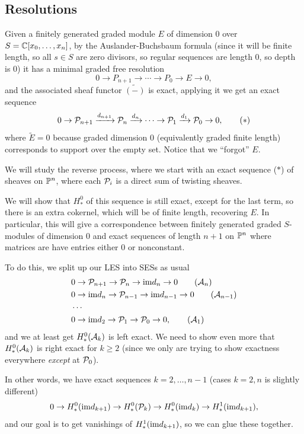 \documentclass[12pt]{article}
\begin{document}
\subsection{Resolutions}
Given a finitely generated graded module $E$ of dimension 0 over $S=\C[x_0,\dots,x_n]$, by the Auslander-Buchsbaum formula (since it will be finite length, so all $s\in S$ are zero divisors, so regular sequences are length 0, so depth is 0) it has a minimal graded free resolution
\[0\to P_{n+1} \to \cdots \to P_0 \to E \to 0,\]
and the associated sheaf functor $\tilde{(-)}$ is exact, applying it we get an exact sequence
\[0 \to \cP_{n+1} \xrightarrow{d_{n+1}} \cP_n \xrightarrow{d_n} \cdots \to \cP_1 \xrightarrow{d_1} \cP_0 \to 0, \tag{$*$}\]
where $\tilde{E}=0$ because graded dimension 0 (equivalently graded finite length) corresponds to support over the empty set. Notice that we ``forgot'' $E$.

We will study the reverse process, where we start with an exact sequence ($*$) of sheaves on $\P^n$, where each $\cP_i$ is a direct sum of twisting sheaves.

We will show that $H_*^0$ of this sequence is still exact, except for the last term, so there is an extra cokernel, which will be of finite length, recovering $E$. In particular, this will give a correspondence between finitely generated graded $S$-modules of dimension 0 and exact sequences of length $n+1$ on $\P^n$ where matrices are have entries either 0 or nonconstant.

To do this, we split up our LES into SESs as usual
\begin{align*}
    & 0 \to \cP_{n+1} \to \cP_n \to \im d_{n} \to 0 \tag{$\cA_n$}\\
    & 0 \to \im d_n \to \cP_{n-1} \to \im d_{n-1} \to 0 \tag{$\cA_{n-1}$}\\
    & \cdots\\
    & 0 \to \im d_2 \to \cP_1 \to \cP_0 \to 0, \tag{$\cA_1$}
\end{align*}
and we at least get $H_*^0(\cA_k)$ is left exact. We need to show even more that $H_*^0(\cA_k)$ is right exact for $k\geq 2$ (since we only are trying to show exactness everywhere \textit{except} at $\cP_0$).

In other words, we have exact sequences $k=2,\dots,n-1$ (cases $k=2,n$ is slightly different)
\[0\to H_*^0(\im d_{k+1}) \to H_*^0(\cP_k) \to H_*^0(\im d_k) \to H_*^1(\im d_{k+1}),\]
and our goal is to get vanishings of $H_*^1(\im d_{k+1})$, so we can glue these together.
\end{document}
